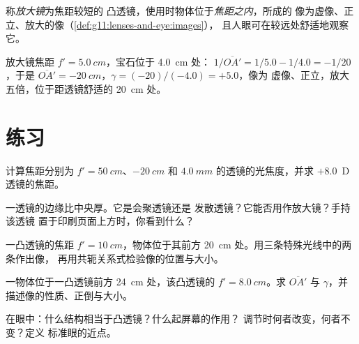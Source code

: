 \begin{definition}[放大镜]\label{def:g11:lenses-and-eye:magnifier}
称\emph{放大镜}为焦距较短的
凸透镜，使用时物体位于\emph{焦距之内}，所成的
像为虚像、正立、放大的像（\cref{def:g11:lenses-and-eye:images}），
且人眼可在较远处舒适地观察它。
\end{definition}

\begin{example}[珠宝匠的放大镜]\label{ex:g11:lenses-and-eye:magnifier}
放大镜焦距 $f' = \qty{5.0}{cm}$，宝石位于 \qty{4.0}{cm} 处：
$1/\overline{OA'} = 1/5.0 - 1/4.0 = -1/20$，于是
$\overline{OA'} = \qty{-20}{cm}$，$\gamma = (-20)/(-4.0) = +5.0$，像为
虚像、正立，放大五倍，位于距透镜舒适的
\qty{20}{cm} 处。
\end{example}

\section{练习}

\begin{exercise}[$\star$]\label{exo:g11:lenses-and-eye:1}
计算焦距分别为 $f' = \qty{50}{cm}$、$\qty{-20}{cm}$ 和
$\qty{4.0}{mm}$ 的透镜的光焦度，并求 $+8.0$~D 透镜的焦距。
\end{exercise}

\begin{exercise}[$\star$]\label{exo:g11:lenses-and-eye:2}
一透镜的边缘比中央厚。它是会聚透镜还是
发散透镜？它能否用作放大镜？手持该透镜
置于印刷页面上方时，你看到什么？
\end{exercise}

\begin{exercise}[$\star$]\label{exo:g11:lenses-and-eye:3}
一凸透镜的焦距 $f' = \qty{10}{cm}$，物体位于其前方
\qty{20}{cm} 处。用三条特殊光线中的两条作出像，
再用共轭关系式检验像的位置与大小。
\end{exercise}

\begin{exercise}[$\star$]\label{exo:g11:lenses-and-eye:4}
一物体位于一凸透镜前方 \qty{24}{cm} 处，该凸透镜的
$f' = \qty{8.0}{cm}$。求 $\overline{OA'}$ 与 $\gamma$，并
描述像的性质、正倒与大小。
\end{exercise}

\begin{exercise}[$\star$]\label{exo:g11:lenses-and-eye:5}
在眼中：什么结构相当于凸透镜？什么起屏幕的作用？
调节时何者改变，何者不变？定义
标准眼的近点。
\end{exercise}

